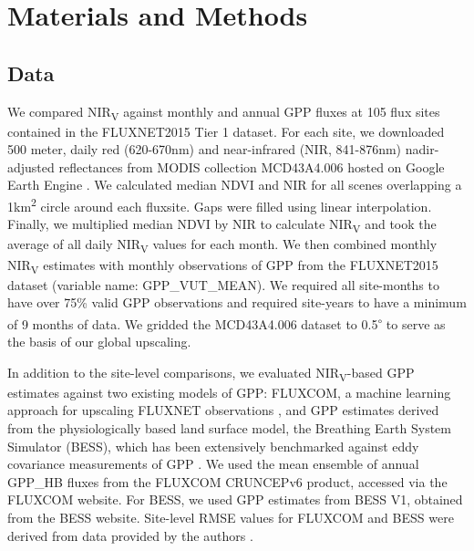 \documentclass[10pt,letterpaper]{article}
\begin{document}
\section*{Materials and Methods}
\subsection*{Data} We compared NIR\textsubscript{V} against monthly and annual GPP fluxes at 105 flux sites contained in the FLUXNET2015  Tier 1 dataset. For each site, we downloaded 500 meter, daily red (620-670nm) and near-infrared (NIR, 841-876nm) nadir-adjusted reflectances from MODIS collection MCD43A4.006  hosted on Google Earth Engine \cite{MODISv6}. We calculated median NDVI and NIR for all scenes overlapping a 1km\textsuperscript{2} circle around each fluxsite. Gaps were filled using linear interpolation. Finally, we multiplied median NDVI by NIR to calculate NIR\textsubscript{V} and took the average of all daily NIR\textsubscript{V} values for each month. We then combined monthly NIR\textsubscript{V} estimates with monthly observations of GPP from the FLUXNET2015 dataset (variable name: GPP\_VUT\_MEAN). We required all site-months to have over 75\% valid GPP observations and required site-years to have a minimum of 9 months of data. We gridded the MCD43A4.006 dataset to 0.5\textsuperscript{$\circ$} to serve as the basis of our global upscaling.

In addition to the site-level comparisons, we evaluated NIR\textsubscript{V}-based GPP estimates against two existing models of GPP: FLUXCOM, a machine learning approach for upscaling FLUXNET observations \cite{tramontana2016predicting}, and GPP estimates derived from the physiologically based land surface  model, the Breathing Earth System Simulator (BESS), which has been extensively benchmarked against eddy covariance measurements of GPP \cite{ryu2011, jiang2016multi}. We used the mean ensemble of annual GPP\_HB fluxes from the FLUXCOM CRUNCEPv6 product, accessed via the FLUXCOM website. For BESS, we used GPP estimates from BESS V1, obtained from the BESS website. Site-level RMSE values for FLUXCOM and BESS were derived from data provided by the authors \cite{tramontana2016predicting, jiang2016multi}.
\end{document}
